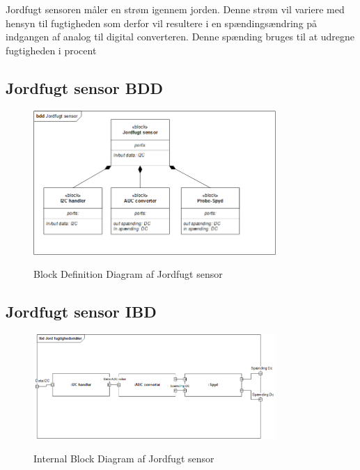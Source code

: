 
Jordfugt sensoren måler en strøm igennem jorden. Denne strøm vil variere med hensyn til fugtigheden som derfor vil resultere i en spændingsændring på indgangen af analog til digital converteren. Denne spænding bruges til at udregne fugtigheden i procent

\subsection{Jordfugt sensor BDD}

\begin{figure}[H]
	\centering
	\includegraphics[width=0.82\textwidth]{Systemarkitektur/Sensor_jordfugtighed/JordFugt_probe_BDD.png}
	\label{fig:Jordfugt sensor BDD}
	\caption{Block Definition Diagram af Jordfugt sensor}
\end{figure}


\subsection{Jordfugt sensor IBD}

\begin{figure}[H]
	\centering
	\includegraphics[width=0.82\textwidth]{Systemarkitektur/Sensor_jordfugtighed/JordFugt_probe_IBD.png}
	\label{fig:Jordfugt sensor IBD}
	\caption{Internal Block Diagram af Jordfugt sensor}
\end{figure}